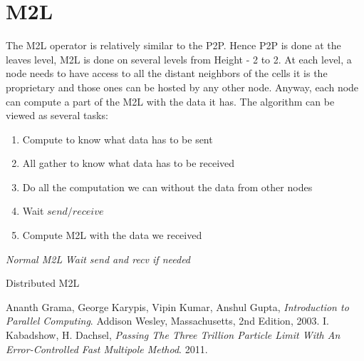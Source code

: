 \documentclass[12pt,letterpaper,titlepage]{report}
\begin{document}
\section{M2L}
The M2L operator is relatively similar to the P2P.
Hence P2P is done at the leaves level, M2L is done on several levels from Height - 2 to 2.
At each level, a node needs to have access to all the distant neighbors of the cells it is the proprietary and those ones can be hosted by any other node.
Anyway, each node can compute a part of the M2L with the data it has.
The algorithm can be viewed as several tasks:
\begin{enumerate}
\item Compute to know what data has to be sent
\item All gather to know what data has to be received
\item Do all the computation we can without the data from other nodes
\item Wait $send/receive$
\item Compute M2L with the data we received
\end{enumerate}
\BlankLine
\begin{algorithm}[H]
  \LinesNumbered
  \SetAlgoLined
  \BlankLine
  \emph{Normal M2L}\;
  \emph{Wait send and recv if needed}\;
  \BlankLine
  \caption{Distributed M2L}
\end{algorithm}
\begin{thebibliography}{9}
  Ananth Grama, George Karypis, Vipin Kumar, Anshul Gupta,
  \emph{Introduction to Parallel Computing}.
  Addison Wesley, Massachusetts,
  2nd Edition,
  2003.
  I. Kabadshow, H. Dachsel,
  \emph{Passing The Three Trillion Particle Limit With An Error-Controlled Fast Multipole Method}.
  2011.
\end{thebibliography}
\end{document}
